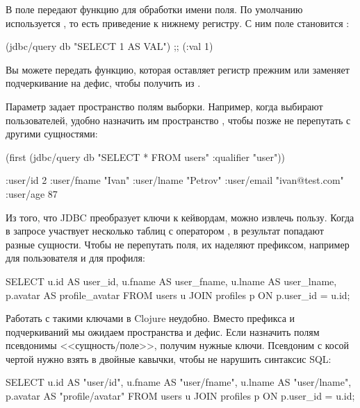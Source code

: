 В поле  передают функцию для обработки имени поля. По умолчанию используется , то есть приведение к нижнему регистру. С ним поле  становится :

\begin{english}
  \begin{clojure}
(jdbc/query db "SELECT 1 AS VAL")
;; ({:val 1})
  \end{clojure}
\end{english}

Вы можете передать функцию, которая оставляет регистр прежним или заменяет подчеркивание на дефис, чтобы получить  из .

Параметр  задает пространство полям выборки. Например, когда выбирают пользователей, удобно назначить им пространство , чтобы позже не перепутать с другими сущностями:

\begin{english}
  \begin{clojure}
(first (jdbc/query db "SELECT * FROM users"
                      {:qualifier "user"}))

{:user/id 2
 :user/fname "Ivan"
 :user/lname "Petrov"
 :user/email "ivan@test.com"
 :user/age 87}
  \end{clojure}
\end{english}

Из того, что JDBC преобразует ключи к кейвордам, можно извлечь пользу. Когда в запросе участвует несколько таблиц с оператором , в результат попадают разные сущности. Чтобы не перепутать поля, их наделяют префиксом, например  для пользователя и  для профиля:

\begin{english}
  \begin{sql}
SELECT
  u.id     AS user_id,
  u.fname  AS user_fname,
  u.lname  AS user_lname,
  p.avatar AS profile_avatar
FROM users u
JOIN profiles p ON p.user_id = u.id;
  \end{sql}
\end{english}

Работать с такими ключами в Clojure неудобно. Вместо префикса и подчеркиваний мы ожидаем пространства и дефис. Если назначить полям псевдонимы <<сущность/поле>>, получим нужные ключи. Псевдоним с косой чертой нужно взять в двойные кавычки, чтобы не нарушить синтаксис SQL:

\begin{english}
  \begin{sql}
SELECT
  u.id     AS "user/id",
  u.fname  AS "user/fname",
  u.lname  AS "user/lname",
  p.avatar AS "profile/avatar"
FROM users u
JOIN profiles p ON p.user_id = u.id;
  \end{sql}
\end{english}


